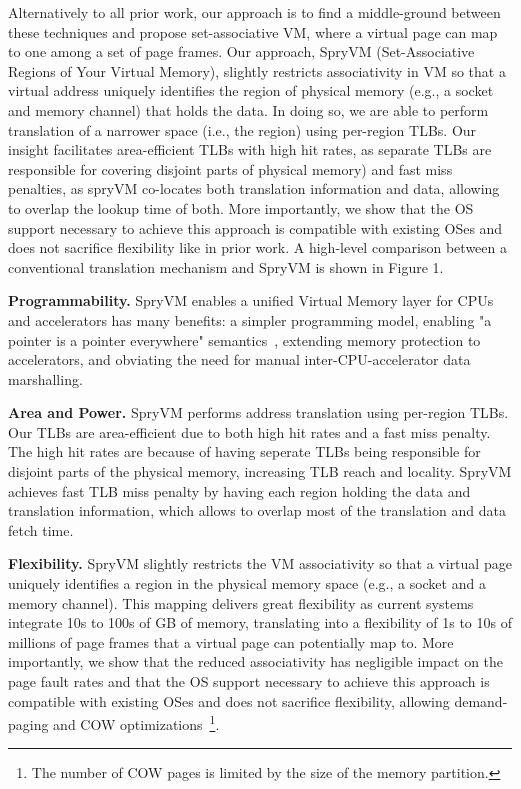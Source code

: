 Alternatively to all prior work, our approach is to find a middle-ground between these techniques and propose set-associative VM, where a virtual page can map to one among a set of page frames. 
Our approach, SpryVM (Set-Associative Regions of Your Virtual Memory), slightly restricts associativity in VM so that a virtual address uniquely identifies the region of physical memory (e.g., a socket and memory channel) that holds the data. In doing so, we are able to perform translation of a narrower space (i.e., the region) using per-region TLBs. Our insight facilitates area-efficient TLBs with high hit rates, as separate TLBs are responsible for covering disjoint parts of physical memory) and fast miss penalties, as spryVM co-locates both translation information and data, allowing to overlap the lookup time of both. More importantly, we show that the OS support necessary to achieve this approach is compatible with existing OSes and does not sacrifice flexibility like in prior work. A high-level comparison between a conventional translation mechanism and SpryVM is shown in Figure 1.

\noindent\textbf{Programmability.} SpryVM enables a unified Virtual Memory layer for CPUs and accelerators has many benefits: a simpler programming model, enabling "a pointer is a pointer everywhere" semantics~\cite{pichai:architectural, power:supporting, vesely:observation}, extending memory protection to accelerators, and obviating the need for manual inter-CPU-accelerator data marshalling.  

\noindent\textbf{Area and Power.} SpryVM performs address translation using per-region TLBs. Our TLBs are area-efficient due to both high hit rates and a fast miss penalty. The high hit rates are because of having seperate TLBs being responsible for disjoint parts of the physical memory, increasing TLB reach and locality. SpryVM achieves fast TLB miss penalty by having each region holding the data and translation information, which allows to overlap most of the translation and data fetch time.


\noindent\textbf{Flexibility.} SpryVM slightly restricts the VM associativity so that a virtual page uniquely identifies a region in the physical memory space (e.g., a socket and a memory channel). This mapping delivers great flexibility as current systems integrate 10s to 100s of GB of memory, translating into a flexibility of 1s to 10s of millions of page frames that a virtual page can potentially map to. More importantly, we show that the reduced associativity has negligible impact on the page fault rates and that the OS support necessary to achieve this approach is compatible with existing OSes and does not sacrifice flexibility, allowing demand-paging and COW optimizations~\footnote{The number of COW pages is limited by the size of the memory partition.}.

